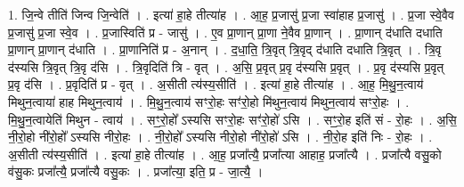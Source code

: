 \documentclass[17pt]{extarticle}
\begin{document}
1. जि॒न्वे तीति॑ जिन्व जि॒न्वेति॑ । . इत्या॑ हा॒हे तीत्या॑ह । . आ॒ह॒ प्र॒जासु॑ प्र॒जा स्वा॑हाह प्र॒जासु॑ । . प्र॒जा स्वे॒वैव प्र॒जासु॑ प्र॒जा स्वे॒व । . प्र॒जास्विति॑ प्र - जासु॑ । . ए॒व प्रा॒णान् प्रा॒णा ने॒वैव प्रा॒णान् । . प्रा॒णान् द॑धाति दधाति प्रा॒णान् प्रा॒णान् द॑धाति । . प्रा॒णानिति॑ प्र - अ॒नान् । . द॒धा॒ति॒ त्रि॒वृत् त्रि॒वृद् द॑धाति दधाति त्रि॒वृत् । . त्रि॒वृ द॑स्यसि त्रि॒वृत् त्रि॒वृ द॑सि । . त्रि॒वृदिति॑ त्रि - वृत् । . अ॒सि॒ प्र॒वृत् प्र॒वृ द॑स्यसि प्र॒वृत् । . प्र॒वृ द॑स्यसि प्र॒वृत् प्र॒वृ द॑सि । . प्र॒वृदिति॑ प्र - वृत् । . अ॒सीती त्य॑स्य॒सीति॑ । . इत्या॑ हा॒हे तीत्या॑ह । . आ॒ह॒ मि॒थु॒न॒त्वाय॑ मिथुन॒त्वाया॑ हाह मिथुन॒त्वाय॑ । . मि॒थु॒न॒त्वाय॑ सꣳरो॒हः सꣳ॑रो॒हो मि॑थुन॒त्वाय॑ मिथुन॒त्वाय॑ सꣳरो॒हः । . मि॒थु॒न॒त्वायेति॑ मिथुन - त्वाय॑ । . सꣳ॒॒रो॒हो᳚ ऽस्यसि सꣳरो॒हः सꣳ॑रो॒हो॑ ऽसि । . सꣳ॒॒रो॒ह इति॑ सं - रो॒हः । . अ॒सि॒ नी॒रो॒हो नी॑रो॒हो᳚ ऽस्यसि नीरो॒हः । . नी॒रो॒हो᳚ ऽस्यसि नीरो॒हो नी॑रो॒हो॑ ऽसि । . नी॒रो॒ह इति॑ निः - रो॒हः । . अ॒सीती त्य॑स्य॒सीति॑ । . इत्या॑ हा॒हे तीत्या॑ह । . आ॒ह॒ प्रजा᳚त्यै॒ प्रजा᳚त्या आहाह॒ प्रजा᳚त्यै । . प्रजा᳚त्यै वसु॒को व॑सु॒कः प्रजा᳚त्यै॒ प्रजा᳚त्यै वसु॒कः । . प्रजा᳚त्या॒ इति॒ प्र - जा॒त्यै॒ । \newline
\end{document}
